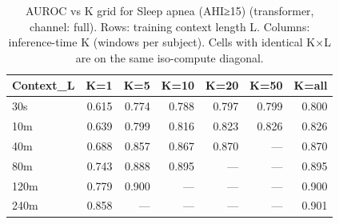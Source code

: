 \begin{table}[ht]
\centering
\caption{AUROC vs K grid for Sleep apnea (AHI≥15) (transformer, channel: full). Rows: training context length L. Columns: inference-time K (windows per subject). Cells with identical K×L are on the same iso-compute diagonal.}
\label{tab:kgrid_apnea_binary_transformer_full}
\begin{tabular}{lrrrrrr}
\toprule
Context_L & K=1 & K=5 & K=10 & K=20 & K=50 & K=all \\
\midrule
30s & 0.615 & 0.774 & 0.788 & 0.797 & 0.799 & 0.800 \\
10m & 0.639 & 0.799 & 0.816 & 0.823 & 0.826 & 0.826 \\
40m & 0.688 & 0.857 & 0.867 & 0.870 & — & 0.870 \\
80m & 0.743 & 0.888 & 0.895 & — & — & 0.895 \\
120m & 0.779 & 0.900 & — & — & — & 0.900 \\
240m & 0.858 & — & — & — & — & 0.901 \\
\bottomrule
\end{tabular}
\end{table}